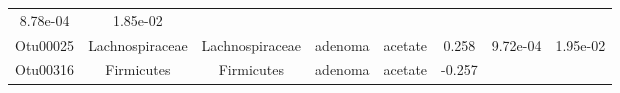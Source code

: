 \documentclass[11pt,]{article}
\begin{document}
\begin{longtable}[]{@{}cccccccc@{}}
\begin{minipage}[t]{0.08\columnwidth}
8.78e-04\strut
\end{minipage} & \begin{minipage}[t]{0.08\columnwidth}\centering\strut
1.85e-02\strut
\end{minipage}\tabularnewline
\begin{minipage}[t]{0.08\columnwidth}\centering\strut
Otu00025\strut
\end{minipage} & \begin{minipage}[t]{0.15\columnwidth}\centering\strut
Lachnospiraceae\strut
\end{minipage} & \begin{minipage}[t]{0.15\columnwidth}\centering\strut
Lachnospiraceae\strut
\end{minipage} & \begin{minipage}[t]{0.08\columnwidth}\centering\strut
adenoma\strut
\end{minipage} & \begin{minipage}[t]{0.09\columnwidth}\centering\strut
acetate\strut
\end{minipage} & \begin{minipage}[t]{0.07\columnwidth}\centering\strut
0.258\strut
\end{minipage} & \begin{minipage}[t]{0.08\columnwidth}\centering\strut
9.72e-04\strut
\end{minipage} & \begin{minipage}[t]{0.08\columnwidth}\centering\strut
1.95e-02\strut
\end{minipage}\tabularnewline
\begin{minipage}[t]{0.08\columnwidth}\centering\strut
Otu00316\strut
\end{minipage} & \begin{minipage}[t]{0.15\columnwidth}\centering\strut
Firmicutes\strut
\end{minipage} & \begin{minipage}[t]{0.15\columnwidth}\centering\strut
Firmicutes\strut
\end{minipage} & \begin{minipage}[t]{0.08\columnwidth}\centering\strut
adenoma\strut
\end{minipage} & \begin{minipage}[t]{0.09\columnwidth}\centering\strut
acetate\strut
\end{minipage} & \begin{minipage}[t]{0.07\columnwidth}\centering\strut
-0.257\strut
\end{minipage} & \begin{minipage}[t]{0.08\columnwidth}\centering\strut

\end{minipage}
\end{longtable}
\end{document}
